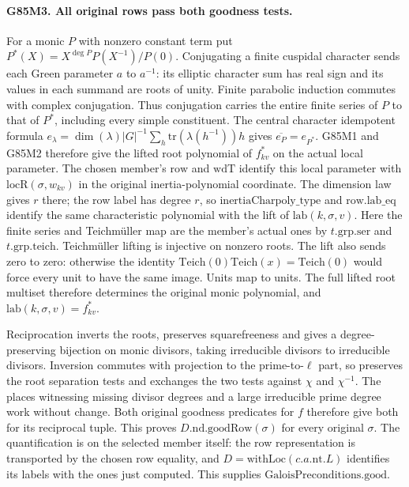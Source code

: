 \paragraph{G85M3. All original rows pass both goodness tests.}
For a monic $P$ with nonzero constant term put
$P^*(X)=X^{\deg P}P(X^{-1})/P(0)$. Conjugating a finite
cuspidal character sends each Green parameter $a$ to $a^{-1}$:
its elliptic character sum has real sign and its values in each
summand are roots of unity. Finite parabolic induction commutes
with complex conjugation. Thus conjugation carries the entire
finite series of $P$ to that of $P^*$, including every simple
constituent. The central character idempotent formula
$e_\lambda=\dim(\lambda)|G|^{-1}\sum_h
\mathrm{tr}(\lambda(h^{-1}))h$ gives
$\overline{e_P}=e_{P^*}$. G85M1 and G85M2 therefore give
the lifted root polynomial of $f_{kv}^*$ on the actual local
parameter. The chosen member's $\mathrm{row}$ and
$\mathrm{wdT}$ identify this local parameter with
$\mathrm{locR}(\sigma,w_{kv})$ in the original inertia-polynomial
coordinate. The dimension law gives $r$ there; the row label
has degree $r$, so $\mathrm{inertiaCharpoly\_type}$ and
$\mathrm{row.lab\_eq}$ identify the same characteristic
polynomial with the lift of $\mathrm{lab}(k,\sigma,v)$.
Here the finite series and Teichm\"uller map are the member's
actual ones by $t.\mathrm{grp.ser}$ and $t.\mathrm{grp.teich}$.
Teichm\"uller lifting is injective on nonzero roots. The lift also sends zero to zero: otherwise the identity
$\mathrm{Teich}(0)\mathrm{Teich}(x)=\mathrm{Teich}(0)$ would
force every unit to have the same image. Units map to units.
The full lifted root multiset therefore determines the original monic
polynomial, and $\mathrm{lab}(k,\sigma,v)=f_{kv}^*$.

Reciprocation inverts the roots, preserves squarefreeness and
gives a degree-preserving bijection on monic divisors, taking
irreducible divisors to irreducible divisors. Inversion commutes
with projection to the prime-to-$\ell$ part, so preserves the
root separation tests and exchanges the two tests against $\chi$
and $\chi^{-1}$. The places witnessing missing divisor degrees
and a large irreducible prime degree work without change.
Both original goodness predicates for $f$ therefore give both
for its reciprocal tuple. This proves $D.\mathrm{nd.goodRow}(\sigma)$
for every original $\sigma$. The quantification is on the selected
member itself: the row representation is transported by the
chosen row equality, and $D=\mathrm{withLoc}(c.a.\mathrm{nt}.L)$
identifies its labels with the ones just computed.
This supplies $\mathrm{GaloisPreconditions.good}$.
